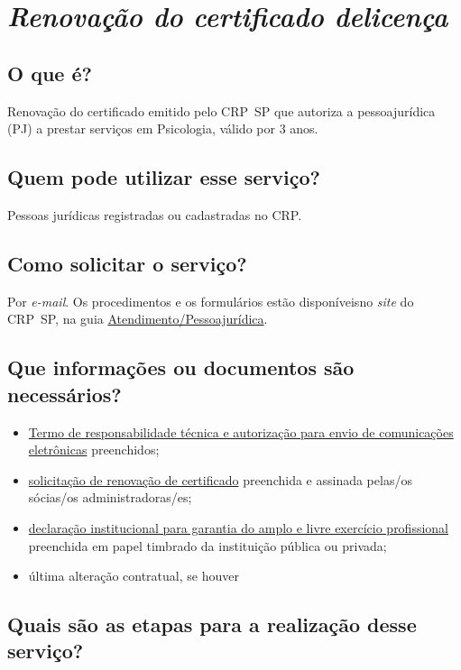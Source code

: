 \chapter{\texorpdfstring{\emph{Renovação do certificado delicença}}{Renovação do certificado de licença}}


\section{O que é?}

Renovação do certificado emitido pelo CRP~SP que autoriza a pessoajurídica (PJ) a prestar serviços em Psicologia, válido por 3 anos.

\section{Quem pode utilizar esse serviço?}

Pessoas jurídicas registradas ou cadastradas no CRP.

\section{Como solicitar o serviço?}

Por \emph{e-mail}. Os procedimentos e os formulários estão disponíveisno \emph{site} do CRP~SP, na guia \href{https://www.crpsp.org/pagina/view/30}{Atendimento/Pessoajurídica}.

\section{Que informações ou documentos são necessários?}

\begin{itemize}
  \item  \hyperref[]{Termo  de responsabilidade técnica e autorização para envio de comunicações  eletrônicas} preenchidos;
  \item  \hyperref[]{solicitação  de renovação de certificado} preenchida e assinada pelas/os sócias/os  administradoras/es;
  \item  \hyperref[]{declaração  institucional para garantia do amplo e livre exercício profissional}  preenchida em papel timbrado da instituição pública ou privada;
  \item  última alteração contratual, se houver
\end{itemize}

\section{Quais são as etapas para a realização desse serviço?}

